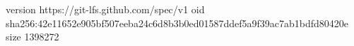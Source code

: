version https://git-lfs.github.com/spec/v1
oid sha256:42e11652e905bf507eeba24c6d8b3b0ed01587ddef5a9f39ac7ab1bdfd80420e
size 1398272
